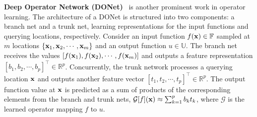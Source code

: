 \noindent\textbf{Deep Operator Network (DONet)}~\citep{lu2021learning} is another prominent work in operator learning. %
The architecture of a DONet is  structured into two components: a branch net and a trunk net, learning representations for the input functions and querying locations, respectively. 
Consider an input function \(f({\bf x}) \in \mathbb{F}\) sampled at \(m\) locations \(\{{\bf x}_1, {\bf x}_2, \cdots, {\bf x}_m\}\) and an output function \(u \in \mathbb{U}\).
The branch net receives the values \([f({\bf x}_1), f({\bf x}_2), \cdots, f({\bf x}_m)]\) and outputs a feature representation \([b_1, b_2, \cdots, b_p]^\top \in \mathbb{R}^p\). Concurrently, the trunk network processes a querying location ${\bf x}$
and outputs another feature vector \([t_1, t_2, \cdots, t_p]^\top \in \mathbb{R}^p\).
The output function value at ${\bf x}$ is predicted as a sum of products of the corresponding elements from the branch and trunk nets, $\mathcal{G}[f]({\bf x}) \approx \sum_{k=1}^p b_k t_k$,
where \(\mathcal{G}\) is the learned operator mapping \(f\) to \(u\).


